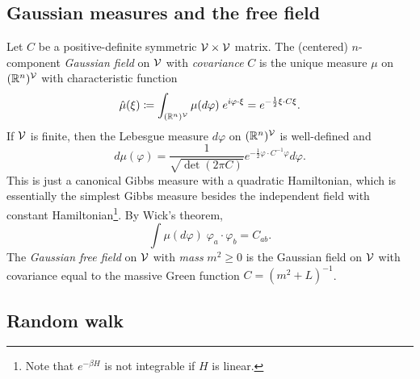 

\subsection{Gaussian measures and the free field}

Let $C$ be a positive-definite symmetric $\mathcal{V}\times\mathcal{V}$ matrix.
The (centered) $n$-component \emph{Gaussian field} on $\mathcal{V}$ with
\emph{covariance} $C$ is the unique measure $\mu$ on $({\mathbb R}^n)^{\mathcal{V}}$ with
characteristic function
\begin{equation}
\hat\mu(\xi)
  \coloneqq
\int_{({\mathbb R}^n)^{\mathcal{V}}} \mu(d\varphi) \; e^{i \varphi \cdot \xi}
  =
e^{-\frac{1}{2} \xi \cdot C \xi}.
\end{equation}
If $\mathcal{V}$ is finite, then the Lebesgue measure $d\varphi$ on $({\mathbb R}^n)^{\mathcal{V}}$
is well-defined and
\begin{equation}
d\mu(\varphi)
  =
\frac{1}{\sqrt{\det(2\pi C)}} e^{-\frac{1}{2} \varphi\cdot C^{-1}\varphi}
d\varphi.
\end{equation}
This is just a canonical Gibbs measure with a quadratic Hamiltonian, which is essentially
the simplest Gibbs measure besides the independent field with constant
Hamiltonian\footnote{Note that $e^{-\beta H}$ is not integrable if $H$ is linear.}.
By Wick's theorem,
\begin{equation}
\int \mu(d\varphi) \; \varphi_a \cdot \varphi_b = C_{ab}.
\end{equation}
The \emph{Gaussian free field} on $\mathcal{V}$ with \emph{mass} $m^2 \ge 0$ is
the Gaussian field on $\mathcal{V}$ with covariance equal to the massive Green
function $C = (m^2 + L)^{-1}$.


\subsection{Random walk}


